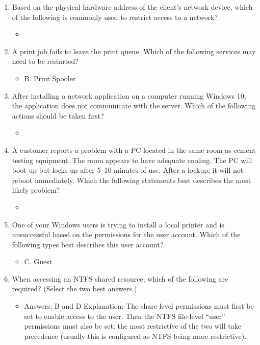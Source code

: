 \documentclass{article}
\begin{document}
\begin{enumerate}
\begin{itemize}
    \end{itemize}
    \item Based on the physical hardware address of the client’s network
device, which of the following is commonly used to restrict access
to a network?
    \begin{itemize}
        \item 
    \end{itemize}
    \item A print job fails to leave the print queue. Which of the following
services may need to be restarted?
    \begin{itemize}
        \item B. Print Spooler
    \end{itemize}
    \item After installing a network application on a computer running
Windows 10, the application does not communicate with the
server. Which of the following actions should be taken first?
    \begin{itemize}
        \item 
    \end{itemize}
    \item A customer reports a problem with a PC located in the same room
as cement testing equipment. The room appears to have adequate
cooling. The PC will boot up but locks up after 5–10 minutes of
use. After a lockup, it will not reboot immediately. Which the following
statements best describes the most likely problem?
    \begin{itemize}
        \item 
    \end{itemize}
    \item One of your Windows users is trying to install a local printer and
is unsuccessful based on the permissions for the user account.
Which of the following types best describes this user account?
    \begin{itemize}
        \item C. Guest
    \end{itemize}
    \item When accessing an NTFS shared resource, which of the following
are required? (Select the two best answers.)
    \begin{itemize}
        \item Answers: B and D
Explanation: The share-level permissions must first be set to enable access to the
user. Then the NTFS file-level “user” permissions must also be set; the most restrictive
of the two will take precedence (usually this is configured as NTFS being more restrictive).

\end{itemize}
\end{enumerate}
\end{document}
